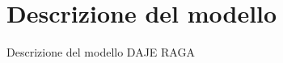 \section{Descrizione del modello}
\begin{frame}{Descrizione del modello}
	\centering
	DAJE RAGA
\end{frame}